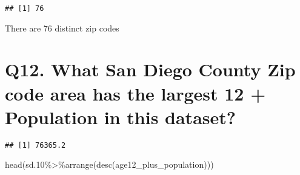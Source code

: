 \documentclass[
]{article}
\newenvironment{Shaded}{\begin{snugshade}}{\end{snugshade}}
\newcommand{\FloatTok}[1]{\textcolor[rgb]{0.00,0.00,0.81}{#1}}
\newcommand{\FunctionTok}[1]{\textcolor[rgb]{0.00,0.00,0.00}{#1}}
\newcommand{\NormalTok}[1]{#1}
\newcommand{\SpecialCharTok}[1]{\textcolor[rgb]{0.00,0.00,0.00}{#1}}
\begin{document}
\begin{verbatim}
## [1] 76
\end{verbatim}

There are 76 distinct zip codes

\hypertarget{q12.-what-san-diego-county-zip-code-area-has-the-largest-12-population-in-this-dataset}{%
\section{Q12. What San Diego County Zip code area has the largest 12 +
Population in this
dataset?}\label{q12.-what-san-diego-county-zip-code-area-has-the-largest-12-population-in-this-dataset}}

\begin{Shaded}
\end{Shaded}

\begin{verbatim}
## [1] 76365.2
\end{verbatim}

\begin{Shaded}
\begin{Highlighting}[]
\FunctionTok{head}\NormalTok{(sd}\FloatTok{.10}\SpecialCharTok{\%\textgreater{}\%}\FunctionTok{arrange}\NormalTok{(}\FunctionTok{desc}\NormalTok{(age12\_plus\_population)))}
\end{Highlighting}
\end{Shaded}
\end{document}
